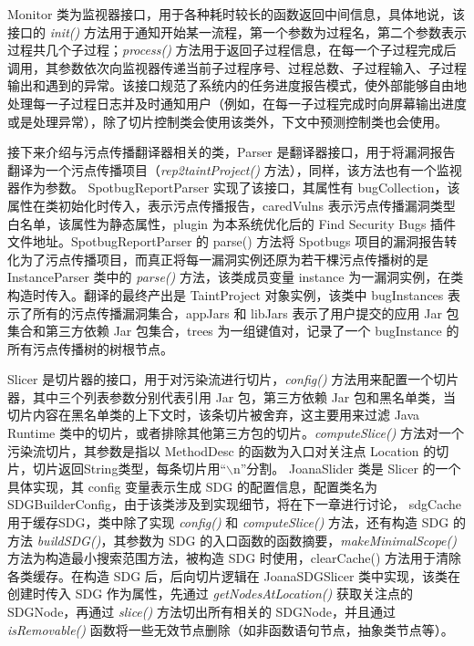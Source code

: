 Monitor 类为监视器接口，用于各种耗时较长的函数返回中间信息，具体地说，该接口的 \textit{init()} 方法用于通知开始某一流程，第一个参数为过程名，第二个参数表示过程共几个子过程；\textit{process()} 方法用于返回子过程信息，在每一个子过程完成后调用，其参数依次向监视器传递当前子过程序号、过程总数、子过程输入、子过程输出和遇到的异常。该接口规范了系统内的任务进度报告模式，使外部能够自由地处理每一子过程日志并及时通知用户（例如，在每一子过程完成时向屏幕输出进度或是处理异常），除了切片控制类会使用该类外，下文中预测控制类也会使用。

接下来介绍与污点传播翻译器相关的类，Parser 是翻译器接口，用于将漏洞报告翻译为一个污点传播项目（\textit{rep2taintProject()} 方法），同样，该方法也有一个监视器作为参数。 SpotbugReportParser 实现了该接口，其属性有 bugCollection，该属性在类初始化时传入，表示污点传播报告，caredVulns 表示污点传播漏洞类型白名单，该属性为静态属性，plugin 为本系统优化后的 Find Security Bugs 插件文件地址。SpotbugReportParser 的 parse() 方法将 Spotbugs 项目的漏洞报告转化为了污点传播项目，而真正将每一漏洞实例还原为若干棵污点传播树的是 InstanceParser 类中的 \textit{parse()} 方法，该类成员变量 instance 为一漏洞实例，在类构造时传入。翻译的最终产出是 TaintProject 对象实例，该类中 bugInstances 表示了所有的污点传播漏洞集合，appJars 和 libJars 表示了用户提交的应用 Jar 包集合和第三方依赖 Jar 包集合，trees 为一组键值对，记录了一个 bugInstance 的所有污点传播树的树根节点。

Slicer 是切片器的接口，用于对污染流进行切片，\textit{config()} 方法用来配置一个切片器，其中三个列表参数分别代表引用 Jar 包，第三方依赖 Jar 包和黑名单类，当切片内容在黑名单类的上下文时，该条切片被舍弃，这主要用来过滤 Java Runtime 类中的切片，或者排除其他第三方包的切片。\textit{computeSlice()} 方法对一个污染流切片，其参数是指以 MethodDesc 的函数为入口对关注点 Location 的切片，切片返回String类型，每条切片用“$\backslash$n”分割。 JoanaSlider 类是 Slicer 的一个具体实现，其 config 变量表示生成 SDG 的配置信息，配置类名为 SDGBuilderConfig，由于该类涉及到实现细节，将在下一章进行讨论， sdgCache 用于缓存SDG，类中除了实现 \textit{config()} 和 \textit{computeSlice()} 方法，还有构造 SDG 的方法 \textit{buildSDG()}，其参数为 SDG 的入口函数的函数摘要，\textit{makeMinimalScope()} 方法为构造最小搜索范围方法，被构造 SDG 时使用，clearCache() 方法用于清除各类缓存。在构造 SDG 后，后向切片逻辑在 JoanaSDGSlicer 类中实现，该类在创建时传入 SDG 作为属性，先通过 \textit{getNodesAtLocation()} 获取关注点的 SDGNode，再通过 \textit{slice()} 方法切出所有相关的 SDGNode，并且通过 \textit{isRemovable()} 函数将一些无效节点删除（如非函数语句节点，抽象类节点等）。

